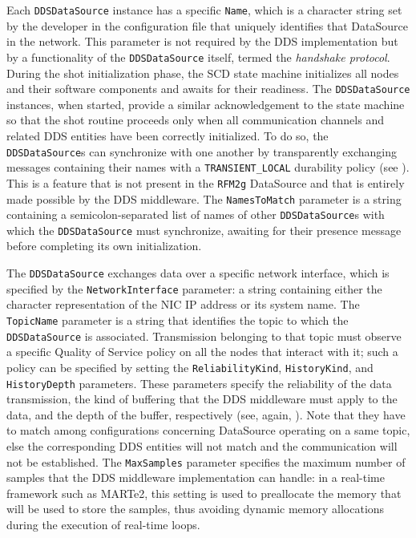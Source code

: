 Each \texttt{DDSDataSource} instance has a specific \texttt{Name}, which is a character string set by the developer in the configuration file that uniquely identifies that DataSource in the network. This parameter is not required by the DDS implementation but by a functionality of the \texttt{DDSDataSource} itself, termed the \emph{handshake protocol}. During the shot initialization phase, the SCD state machine initializes all nodes and their software components and awaits for their readiness. The \texttt{DDSDataSource} instances, when started, provide a similar acknowledgement to the state machine so that the shot routine proceeds only when all communication channels and related DDS entities have been correctly initialized. To do so, the \texttt{DDSDataSource}s can synchronize with one another by transparently exchanging messages containing their names with a \texttt{TRANSIENT\_LOCAL} durability policy (see ). This is a feature that is not present in the \texttt{RFM2g} DataSource and that is entirely made possible by the DDS middleware. The \texttt{NamesToMatch} parameter is a string containing a semicolon-separated list of names of other \texttt{DDSDataSource}s with which the \texttt{DDSDataSource} must synchronize, awaiting for their presence message before completing its own initialization.

The \texttt{DDSDataSource} exchanges data over a specific network interface, which is specified by the \texttt{NetworkInterface} parameter: a string containing either the character representation of the NIC IP address or its system name. The \texttt{TopicName} parameter is a string that identifies the topic to which the \texttt{DDSDataSource} is associated. Transmission belonging to that topic must observe a specific Quality of Service policy on all the nodes that interact with it; such a policy can be specified by setting the \texttt{ReliabilityKind}, \texttt{HistoryKind}, and \texttt{HistoryDepth} parameters. These parameters specify the reliability of the data transmission, the kind of buffering that the DDS middleware must apply to the data, and the depth of the buffer, respectively (see, again, ). Note that they have to match among configurations concerning DataSource operating on a same topic, else the corresponding DDS entities will not match and the communication will not be established. The \texttt{MaxSamples} parameter specifies the maximum number of samples that the DDS middleware implementation can handle: in a real-time framework such as MARTe2, this setting is used to preallocate the memory that will be used to store the samples, thus avoiding dynamic memory allocations during the execution of real-time loops.

